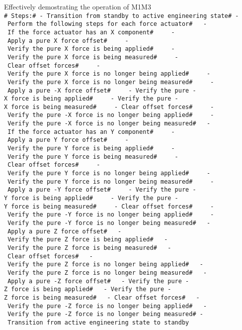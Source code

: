 \documentclass[SE,lsstdraft,STR,toc]{lsstdoc}
\begin{document}
Effectively demostrating the operation of
M1M3\\[2\baselineskip]\texttt{\#\ Steps:\#\ -\ Transition\ from\ standby\ to\ active\ engineering\ state\#\ -\ Perform\ the\ following\ steps\ for\ each\ force\ actuator\#\ ~\ -\ If\ the\ force\ actuator\ has\ an\ X\ component\#\ ~\ ~\ -\ Apply\ a\ pure\ X\ force\ offset\#\ ~\ ~\ -\ Verify\ the\ pure\ X\ force\ is\ being\ applied\#\ ~\ ~\ -\ Verify\ the\ pure\ X\ force\ is\ being\ measured\#\ ~\ ~\ -\ Clear\ offset\ forces\#\ ~\ ~\ -\ Verify\ the\ pure\ X\ force\ is\ no\ longer\ being\ applied\#\ ~\ ~\ -\ Verify\ the\ pure\ X\ force\ is\ no\ longer\ being\ measured\#\ ~\ ~\ -\ Apply\ a\ pure\ -X\ force\ offset\#\ ~\ ~\ -\ Verify\ the\ pure\ -X\ force\ is\ being\ applied\#\ ~\ ~\ -\ Verify\ the\ pure\ -X\ force\ is\ being\ measured\#\ ~\ ~\ -\ Clear\ offset\ forces\#\ ~\ ~\ -\ Verify\ the\ pure\ -X\ force\ is\ no\ longer\ being\ applied\#\ ~\ ~\ -\ Verify\ the\ pure\ -X\ force\ is\ no\ longer\ being\ measured\#\ ~\ -\ If\ the\ force\ actuator\ has\ an\ Y\ component\#\ ~\ ~\ -\ Apply\ a\ pure\ Y\ force\ offset\#\ ~\ ~\ -\ Verify\ the\ pure\ Y\ force\ is\ being\ applied\#\ ~\ ~\ -\ Verify\ the\ pure\ Y\ force\ is\ being\ measured\#\ ~\ ~\ -\ Clear\ offset\ forces\#\ ~\ ~\ -\ Verify\ the\ pure\ Y\ force\ is\ no\ longer\ being\ applied\#\ ~\ ~\ -\ Verify\ the\ pure\ Y\ force\ is\ no\ longer\ being\ measured\#\ ~\ ~\ -\ Apply\ a\ pure\ -Y\ force\ offset\#\ ~\ ~\ -\ Verify\ the\ pure\ -Y\ force\ is\ being\ applied\#\ ~\ ~\ -\ Verify\ the\ pure\ -Y\ force\ is\ being\ measured\#\ ~\ ~\ -\ Clear\ offset\ forces\#\ ~\ ~\ -\ Verify\ the\ pure\ -Y\ force\ is\ no\ longer\ being\ applied\#\ ~\ ~\ -\ Verify\ the\ pure\ -Y\ force\ is\ no\ longer\ being\ measured\#\ ~\ -\ Apply\ a\ pure\ Z\ force\ offset\#\ ~\ -\ Verify\ the\ pure\ Z\ force\ is\ being\ applied\#\ ~\ -\ Verify\ the\ pure\ Z\ force\ is\ being\ measured\#\ ~\ -\ Clear\ offset\ forces\#\ ~\ -\ Verify\ the\ pure\ Z\ force\ is\ no\ longer\ being\ applied\#\ ~\ -\ Verify\ the\ pure\ Z\ force\ is\ no\ longer\ being\ measured\#\ ~\ -\ Apply\ a\ pure\ -Z\ force\ offset\#\ ~\ -\ Verify\ the\ pure\ -Z\ force\ is\ being\ applied\#\ ~\ -\ Verify\ the\ pure\ -Z\ force\ is\ being\ measured\#\ ~\ -\ Clear\ offset\ forces\#\ ~\ -\ Verify\ the\ pure\ -Z\ force\ is\ no\ longer\ being\ applied\#\ ~\ -\ Verify\ the\ pure\ -Z\ force\ is\ no\ longer\ being\ measured\#\ -\ Transition\ from\ active\ engineering\ state\ to\ standby}
\end{document}

